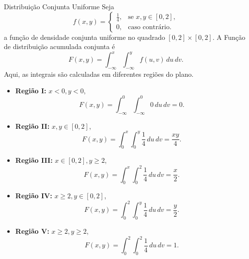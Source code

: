 \begin{frame}{Distribuição Conjunta Uniforme}
\small Seja 
	\[
	f(x, y) =
	\begin{cases}
		\frac{1}{4}, & \text{se } x, y \in [0, 2], \\
		0, & \text{caso contrário}.
	\end{cases}
	\]
	a função de densidade conjunta uniforme no quadrado \([0, 2] \times [0, 2]\). A Função de distribuição acumulada conjunta é
	\[
	F(x, y) = \int_{-\infty}^x \int_{-\infty}^y f(u, v) \, du \, dv.
	\]
	Aqui, as integrais são calculadas em diferentes regiões do plano.
	\small
		\begin{itemize}
		\item \textbf{Região I:} \(x < 0, y < 0\),
		\[
		F(x, y) = \int_{-\infty}^0 \int_{-\infty}^0 0 \, du \, dv = 0.
		\]
		\item \textbf{Região II:} \(x, y \in [0, 2]\),
		\[
		F(x, y) = \int_{0}^x \int_{0}^y \frac{1}{4} \, du \, dv = \frac{xy}{4}.
		\]
		\item \textbf{Região III:} \(x \in [0, 2], y \geq 2\),
		\[
		F(x, y) = \int_{0}^x \int_{0}^2 \frac{1}{4} \, du \, dv = \frac{x}{2}.
		\]
		\item \textbf{Região IV:} \(x \geq 2, y \in [0, 2]\),
		\[
		F(x, y) = \int_{0}^2 \int_{0}^y \frac{1}{4} \, du \, dv = \frac{y}{2}.
		\]
		\item \textbf{Região V:} \(x \geq 2, y \geq 2\),
		\[
		F(x, y) = \int_{0}^2 \int_{0}^2 \frac{1}{4} \, du \, dv = 1.
		\]
	\end{itemize}
	
\end{frame}


